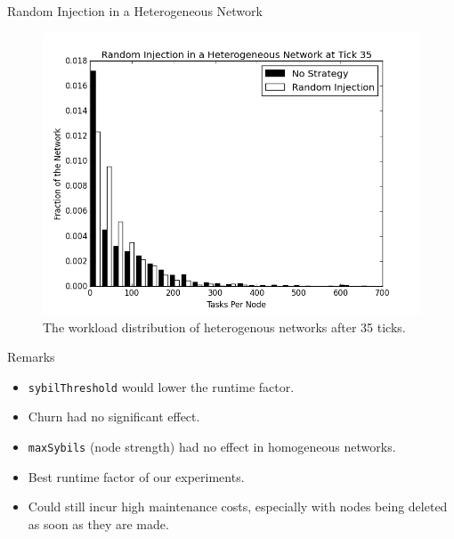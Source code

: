 \documentclass[11pt]{beamer}
\begin{document}


\begin{frame}{Random Injection in a Heterogeneous Network}
\begin{figure}
	\centering
	\includegraphics[width=0.7\linewidth]{figs/randomStableHistHetero35}
	\caption[Random injection in a Heterogenous Network]{The workload distribution of heterogenous networks after 35 ticks.  }
	\label{fig:randomStableHistHetero35}
\end{figure}
\end{frame}

\begin{frame}{Remarks}
	\begin{itemize}
		\item \texttt{sybilThreshold} would lower the runtime factor.  
		\item Churn had no significant effect.
		\item \texttt{maxSybils} (node strength) had no effect in homogeneous networks.
		\item Best runtime factor of our experiments.
		\item Could still incur high maintenance costs, especially with nodes being deleted as soon as they are made.
	\end{itemize}
\end{frame}
\end{document}
